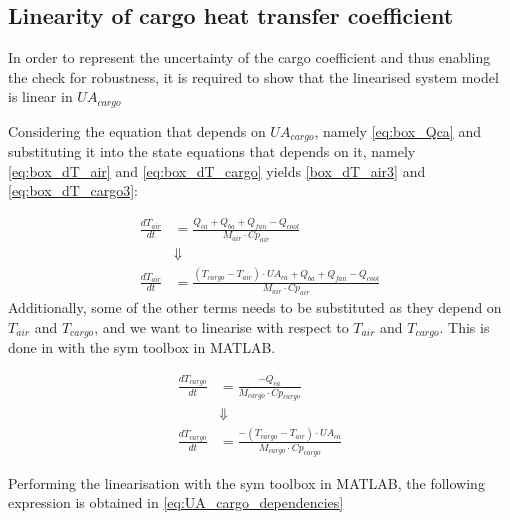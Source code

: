 \subsection{Linearity of cargo heat transfer coefficient}
In order to represent the uncertainty of the cargo coefficient and thus enabling the check for robustness, it is required to show that the linearised system model is linear in $ UA_{cargo} $

Considering the equation that depends on $ UA_{cargo} $, namely \cref{eq:box_Qca} and substituting it into the state equations that depends on it, namely \cref{eq:box_dT_air} and \cref{eq:box_dT_cargo} yields \cref{box_dT_air3} and \cref{eq:box_dT_cargo3}:

\begin{align}
	\frac{dT_{air}}{dt} & = \frac{Q_{ca} + Q_{ba} + Q_{fan} -Q_{cool}}{M_{air} \cdot Cp_{air}} \label{eq:box_dT_air2} \\
	& \Downarrow \nonumber \\ 
	\frac{dT_{air}}{dt} & = \frac{(T_{cargo} - T_{air}) \cdot U A_{ca} + Q_{ba} + Q_{fan} -Q_{cool}}{M_{air} \cdot Cp_{air}} \label{eq:box_dT_air3} 
\end{align}
Additionally, some of the other terms needs to be substituted as they depend on $ T_{air} $ and $ T_{cargo} $, and we want to linearise with respect to $ T_{air} $ and $ T_{cargo} $. This is done in with the sym toolbox in MATLAB.

\begin{align} 
	\frac{dT_{cargo}}{dt} & = \frac{-Q_{ca}}{M_{cargo} \cdot Cp_{cargo}} \label{eq:box_dT_cargo2} \\
	& \Downarrow \nonumber \\ 
	\frac{dT_{cargo}}{dt} & = \frac{-(T_{cargo} - T_{air}) \cdot U A_{ca} }{M_{cargo} \cdot Cp_{cargo}} \label{eq:box_dT_cargo3} 
\end{align}

Performing the linearisation with the sym toolbox in MATLAB, the following expression is obtained in \cref{eq:UA_cargo_dependencies}

